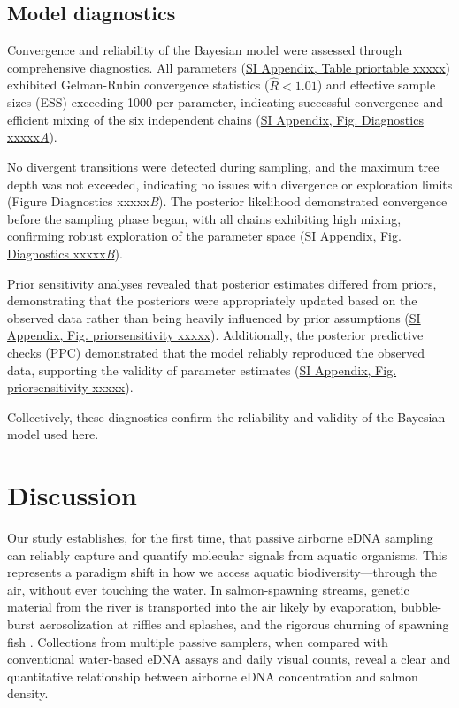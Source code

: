 \documentclass{article}
\begin{document}
\subsection{Model diagnostics}

Convergence and reliability of the Bayesian model were assessed through comprehensive diagnostics. All parameters (\href{SI_Appendix.pdf}{SI Appendix, Table priortable xxxxx}) exhibited Gelman-Rubin convergence statistics ($\hat{R} < 1.01$) and effective
sample sizes (ESS) exceeding 1000 per parameter, indicating successful convergence and efficient mixing of
the six independent chains (\href{SI_Appendix.pdf}{SI Appendix, Fig. Diagnostics xxxxx\textit{A}}). 


No divergent transitions were detected during sampling, and the maximum tree depth was not exceeded, indicating no issues with divergence or exploration limits (Figure Diagnostics xxxxx\textit{B}). The posterior likelihood demonstrated convergence before the sampling phase began, with all chains exhibiting high mixing, confirming robust exploration of the parameter space (\href{SI_Appendix.pdf}{SI Appendix, Fig. Diagnostics xxxxx\textit{B}}).

Prior sensitivity analyses revealed that posterior estimates differed from priors, demonstrating that the posteriors were appropriately updated based on the observed data rather than being heavily influenced by prior assumptions (\href{SI_Appendix.pdf}{SI Appendix, Fig. priorsensitivity xxxxx}). Additionally, the posterior predictive checks (PPC) demonstrated that the model reliably reproduced the observed data, supporting the validity of parameter estimates (\href{SI_Appendix.pdf}{SI Appendix, Fig. priorsensitivity xxxxx}). 

Collectively, these diagnostics confirm the reliability and validity of the Bayesian model used here.


\section{Discussion}
Our study establishes, for the first time, that passive airborne eDNA sampling can reliably capture and quantify molecular signals from aquatic organisms. This represents a paradigm shift in how we access aquatic biodiversity—through the air, without ever touching the water. In salmon-spawning streams, genetic material from the river is transported into the air likely by evaporation, bubble-burst aerosolization at riffles and splashes, and the rigorous churning of spawning fish \cite{wood2021,prather2013}. Collections from multiple passive samplers, when compared with conventional water-based eDNA assays and daily visual counts, reveal a clear and quantitative relationship between airborne eDNA concentration and salmon density. 
\end{document}
